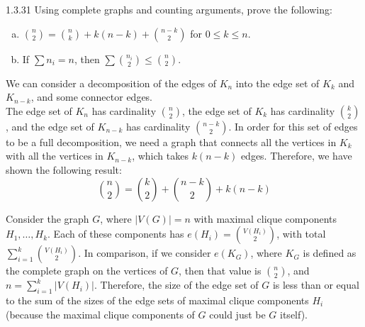 \documentclass[9pt]{extarticle}
\begin{document}
  \begin{problem}{1.3.31}
    Using complete graphs and counting arguments, prove the following:
    \begin{enumerate}[(a)]
      \item ${ n\choose 2 } = { n\choose k } + k(n-k) + { n-k\choose 2 }$ for $0\leq k \leq n$.
      \item If $\sum n_i = n$, then $\sum { n_i\choose 2 } \leq { n\choose 2 }$.
    \end{enumerate}
    \tcblower
    \begin{tcolorbox}[colback = white, title = (a), breakable]
      We can consider a decomposition of the edges of $K_n$ into the edge set of $K_k$ and $K_{n-k}$, and some connector edges.\\

      The edge set of $K_n$ has cardinality ${n\choose 2}$, the edge set of $K_k$ has cardinality ${ k\choose 2 }$, and the edge set of $K_{n-k}$ has cardinality ${ n-k\choose 2 }$. In order for this set of edges to be a full decomposition, we need a graph that connects all the vertices in $K_k$ with all the vertices in $K_{n-k}$, which takes $k(n-k)$ edges. Therefore, we have shown the following result:
      \[
        { n\choose 2 } = { k\choose 2 } + { n-k\choose 2 } + k(n-k)
      \] 
    \end{tcolorbox}
    \begin{tcolorbox}[colback = white, title = (b), breakable]
      Consider the graph $G$, where $|V(G)| = n$ with maximal clique components $H_{1},\dots,H_{k}$. Each of these components has $e(H_i) = { V(H_i) \choose 2 }$, with total $\sum_{i=1}^{k}{ V(H_i)\choose 2 }$. In comparison, if we consider $e(K_{G})$, where $K_G$ is defined as the complete graph on the vertices of $G$, then that value is ${ n\choose 2 }$, and $n = \sum_{i = 1}^{k} |V(H_i)|$. Therefore, the size of the edge set of $G$ is less than or equal to the sum of the sizes of the edge sets of maximal clique components $H_i$ (because the maximal clique components of $G$ could just be $G$ itself).
    \end{tcolorbox}
  \end{problem}
\end{document}
